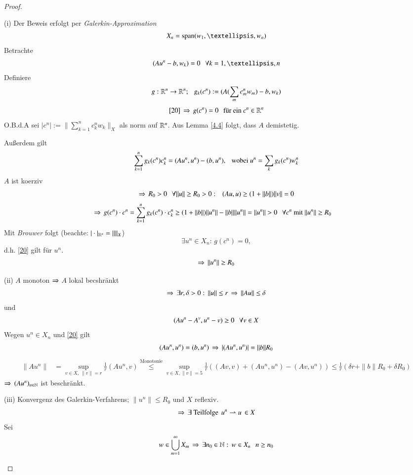 \begin{proof}
    \begin{description}
    \item{(i)}
    Der Beweis erfolgt per \textit{Galerkin-Approximation}
    \[
        X_n=\mr{span}(w_1,…,w_n)
    \]
    Betrachte
    \begin{equation}\label{20}
        (Au^n-b,w_k)=0 \qq \forall k=1,…,n
    \end{equation}
    Definiere
    \[
        g:\mathbb{R}^n\rightarrow \mathbb{R}^n; \hspace{.25cm} g_k(c^n):= (A(\sum_mc_m^nw_m)-b,w_k)
    \]
    \[
        \ref{20} \, \Rightarrow \, g(c^n)=0 \hspace{.25cm} \text{für ein } c^n\in\mathbb{R}^n  
    \]
    O.B.d.A sei $|c^n|:= \|\sum_{k=1}^n c^n_kw_k\|_X$ als norm auf $\mathbb{R}^n$. Aus Lemma \ref{4.4} folgt,
    dass $A$ demistetig. 

    Außerdem gilt
    \[
        \sum_{k=1}^n g_k(c^n)c^n_k=(Au^n,u^n)-(b,u^n), \hspace{.25cm} \text{wobei } u^n=\sum_kg_k(c^n)w_k^n
    \]
    $A$ ist koerziv
    \[
        \Rightarrow \, R_0>0 \hspace{.25cm} \forall \|u\|\geq R_0>0: \hspace{.25cm} (Au,u)\geq (1+\|b\|)\|v\| =0
    \]
    \begin{align*}
        \Ra \, g(c^n)\cdot c^n &= \sum_{k=1}^ng_k(c^n)\cdot c_k^n \geq (1+\|b\|)\|u^n\| - \|b\|\|u^n\|
        =\|u^n\|>0 \qq \forall c^n \text{ mit } \|u^n\|\geq R_0
    \end{align*}
    Mit \textit{Brouwer} folgt (beachte: $|\cdot|_{\mathbb{R}^n}=\|\|_X$)
    \[
        \exists u^n\in X_n: \, g(c^n)=0,
    \]
    d.h. \ref{20} gilt für $u^n$.
    \[
        \Rightarrow \, \|u^n\|\geq R_0
    \]
    \item{(ii)}
    $A$ monoton $\Rightarrow$ $A$ lokal becshränkt
    \[
        \Rightarrow \, \exists r,\delta>0: \, \|u\|\leq r \, \Rightarrow \, \|Au\|\leq \delta
    \]
    und
    \[
        (Au^n-A^v,u^n-v)\geq 0 \hspace{.25cm} \forall v\in X
    \]
    Wegen $u^n\in X_n$ und \ref{20} gilt
    \[
        (Au^n,u^n)=(b,u^n)\, \Rightarrow \, |(Au^n,u^n)|=\|b\|R_0
    \]
    \begin{align*}
        \|Au^n\|&= \sup_{v\in X, \, \|v\|=r} \frac1r(Au^n,v) \overset{\text{Monotonie}}{\leq} 
        \sup_{v\in X, \|v\|=5} \frac1r ((Av,v)+(Au^n,u^n)-(Av,u^n)) \leq \frac1r (\delta r+ \|b\|R_0
                +\delta R_0)
    \end{align*}
    $\Rightarrow $ $(Au^n)_{n\in \mathbb{N}}$ ist beschränkt.
    \item{(iii)}
    Konvergenz des Galerkin-Verfahrens; $\|u^n\|\leq R_0$ und $X$ reflexiv.
    \[
        \Rightarrow \, \exists \text{ Teilfolge } \, u^n\rightharpoonup u \,\in X
    \]
    Sei 
    \[
        w\in \bigcup_{m=1}^\infty X_m \, \Rightarrow \, \exists n_0\in\mathbb{N}: \, w\in X_n\hspace{.25cm} n\geq n_0
\]
\end{description}
\end{proof}
